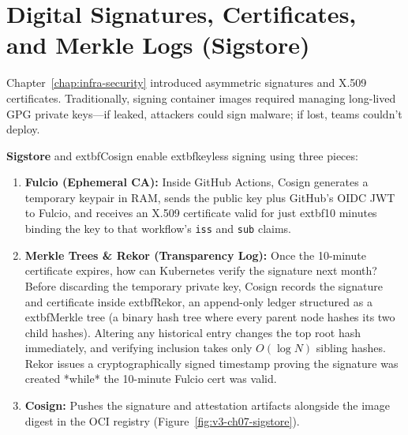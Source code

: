 \section{Digital Signatures, Certificates, and Merkle Logs (Sigstore)}

Chapter~\ref{chap:infra-security} introduced asymmetric signatures and X.509 certificates. Traditionally, signing container images required managing long-lived GPG private keys—if leaked, attackers could sign malware; if lost, teams couldn't deploy.

\textbf{Sigstore} and 	extbf{Cosign} enable 	extbf{keyless signing} using three pieces:
\begin{enumerate}[leftmargin=15pt]
  \item \textbf{Fulcio (Ephemeral CA):} Inside GitHub Actions, Cosign generates a temporary keypair in RAM, sends the public key plus GitHub's OIDC JWT to Fulcio, and receives an X.509 certificate valid for just 	extbf{10 minutes} binding the key to that workflow's \texttt{iss} and \texttt{sub} claims.
  \item \textbf{Merkle Trees \& Rekor (Transparency Log):} Once the 10-minute certificate expires, how can Kubernetes verify the signature next month? Before discarding the temporary private key, Cosign records the signature and certificate inside 	extbf{Rekor}, an append-only ledger structured as a 	extbf{Merkle tree} (a binary hash tree where every parent node hashes its two child hashes). Altering any historical entry changes the top root hash immediately, and verifying inclusion takes only $O(\log N)$ sibling hashes. Rekor issues a cryptographically signed timestamp proving the signature was created *while* the 10-minute Fulcio cert was valid.
  \item \textbf{Cosign:} Pushes the signature and attestation artifacts alongside the image digest in the OCI registry (Figure~\ref{fig:v3-ch07-sigstore}).
\end{enumerate}

